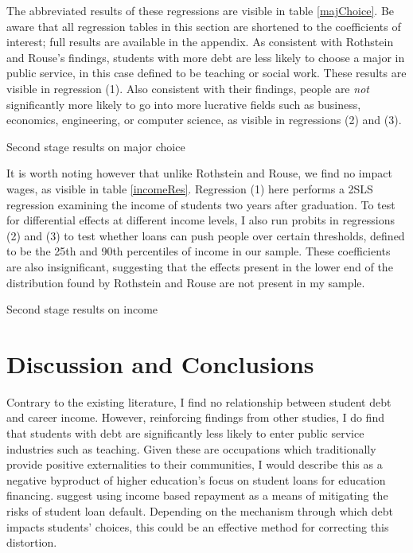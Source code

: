 \documentclass[12pt]{article}
\newcommand{\regs}{../Analysis/Regressions/Output/}
\begin{document}
	The abbreviated results of these regressions are visible in table \ref{majChoice}. Be aware that all regression tables in this section are shortened to the coefficients of interest; full results are available in the appendix. As consistent with Rothstein and Rouse's findings, students with more debt are less likely to choose a major in public service, in this case defined to be teaching or social work. These results are visible in regression (1). Also consistent with their findings, people are \emph{not} significantly more likely to go into more lucrative fields such as business, economics, engineering, or computer science, as visible in regressions (2) and (3). 

	\begin{table}
		\centering
		\caption{Second stage results on major choice}		
		
		\label{majChoice}
	\end{table}
	
	It is worth noting however that unlike Rothstein and Rouse, we find no impact wages, as visible in table \ref{incomeRes}. Regression (1) here performs a 2SLS regression examining the income of students two years after graduation. To test for differential effects at different income levels, I also run probits in regressions (2) and (3) to test whether loans can push people over certain thresholds, defined to be the 25th and 90th percentiles of income in our sample. These coefficients are also insignificant, suggesting that the effects present in the lower end of the distribution found by Rothstein and Rouse are not present in my sample.
	
	\begin{table}
		\centering
		\caption{Second stage results on income}		
		
		\label{incomeRes}
	\end{table}
	
	\section{Discussion and Conclusions}
	
	Contrary to the existing literature, I find no relationship between student debt and career income. However, reinforcing findings from other studies, I do find that students with debt are significantly less likely to enter public service industries such as teaching. Given these are occupations which traditionally provide positive externalities to their communities, I would describe this as a negative byproduct of higher education's focus on student loans for education financing. \textcite{abraham2018} suggest using income based repayment as a means of mitigating the risks of student loan default. Depending on the mechanism through which debt impacts students' choices, this could be an effective method for correcting this distortion.
	\clearpage
	\appendix
\end{document}
